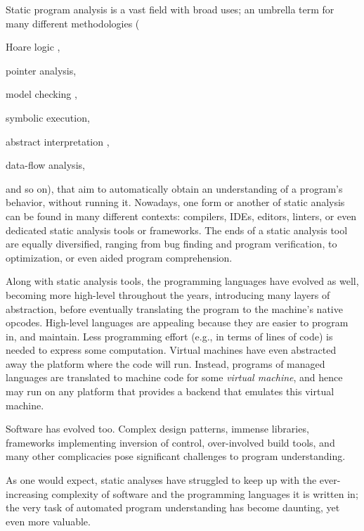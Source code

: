 Static program analysis is a vast field with broad uses; an umbrella
term for many different methodologies (%
\begin{inparablank}
  \item Hoare logic
    \cite{journals/cacm/Hoare69,floyd1967assigning,lics:2002/Reynolds,csl/OHearnRY01},
  \item pointer analysis,
  \item model checking
    \cite{icalp/EmersonC80,lop/ClarkeE81,toplas/ClarkeES86,programm/QueilleS82},
  \item symbolic execution,
  \item abstract interpretation
    \cite{popl/CousotC77,journals/jlp/CousotC92,journals/logcom/CousotC92},
  \item data-flow analysis,
\end{inparablank}
and so on), that aim to automatically obtain an
understanding of a program's behavior, without running it. Nowadays,
one form or another of static analysis can be found in many different
contexts: compilers, IDEs, editors, linters, or even dedicated static
analysis tools or frameworks. The ends of a static analysis tool are
equally diversified, ranging from bug finding and program
verification, to optimization, or even aided program comprehension.

Along with static analysis tools, the programming languages have
evolved as well, becoming more high-level throughout the years,
introducing many layers of abstraction, before eventually translating
the program to the machine's native opcodes. High-level languages are
appealing because they are easier to program in, and maintain. Less
programming effort (e.g., in terms of lines of code) is needed to
express some computation. Virtual machines have even abstracted away
the platform where the code will run. Instead, programs of managed
languages are translated to machine code for some \emph{virtual
  machine}, and hence may run on any platform that provides a backend
that emulates this virtual machine.

Software has evolved too. Complex design patterns, immense libraries,
frameworks implementing inversion of control, over-involved build
tools, and many other complicacies pose significant challenges to
program understanding.

As one would expect, static analyses have struggled to keep up with
the ever-increasing complexity of software and the programming
languages it is written in; the very task of automated program
understanding has become daunting, yet even more valuable.

